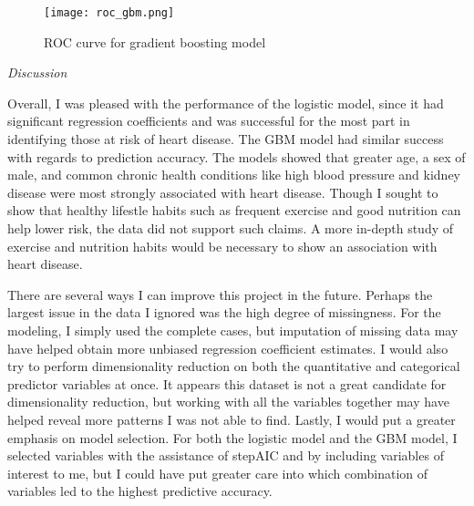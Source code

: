 \documentclass[12pt]{article}
\begin{document}
\begin{figure}[h!]
\centering
\texttt{[image: roc\_gbm.png]}
\caption{ROC curve for gradient boosting model}
\end{figure}

\newpage \noindent \textit{Discussion}

\medskip Overall, I was pleased with the performance of the logistic model, since it had significant regression coefficients and was successful for the most part in identifying those at risk of heart disease. The GBM model had similar success with regards to prediction accuracy. The models showed that greater age, a sex of male, and common chronic health conditions like high blood pressure and kidney disease were most strongly associated with heart disease. Though I sought to show that healthy lifestle habits such as frequent exercise and good nutrition can help lower risk, the data did not support such claims. A more in-depth study of exercise and nutrition habits would be necessary to show an association with heart disease.

There are several ways I can improve this project in the future. Perhaps the largest issue in the data I ignored was the high degree of missingness. For the modeling, I simply used the complete cases, but imputation of missing data may have helped obtain more unbiased regression coefficient estimates. I would also try to perform dimensionality reduction on both the quantitative and categorical predictor variables at once. It appears this dataset is not a great candidate for dimensionality reduction, but working with all the variables together may have helped reveal more patterns I was not able to find. Lastly, I would put a greater emphasis on model selection. For both the logistic model and the GBM model, I selected variables with the assistance of stepAIC and by including variables of interest to me, but I could have put greater care into which combination of variables led to the highest predictive accuracy.
\end{document}
